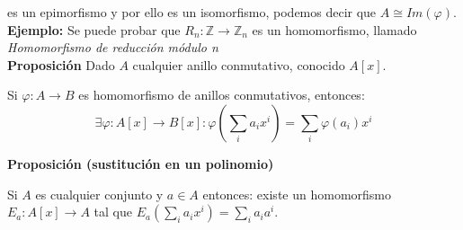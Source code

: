 \documentclass[11pt]{article}
\providecommand{\ent}{\mathbb{Z}}
\begin{document}
es un epimorfismo y por ello es un isomorfismo, podemos decir que $A \cong Im(\varphi)$.\\


\textbf{Ejemplo:} Se puede probar que $R_n: \ent \to \ent_n$ es un homomorfismo, llamado \emph{Homomorfismo de reducción módulo n}\\


\textbf{Proposición}
 Dado $A$ cualquier anillo conmutativo, conocido $A[x]$.
 
 Si $\varphi:A \to B$ es homomorfismo de anillos conmutativos, entonces:
 \[
 \exists \varphi: A[x] \to B[x] : \varphi\left(\sum_i a_i x^i\right) = \sum_i\varphi(a_i) x^i
 \]


\textbf{Proposición (sustitución en un polinomio)}

Si $A$ es cualquier conjunto y $a \in A$ entonces: existe un homomorfismo $E_a: A[x] \to A$ tal que $E_a(\sum_i a_i x^i) = \sum_i a_i a^i$.
\end{document}
